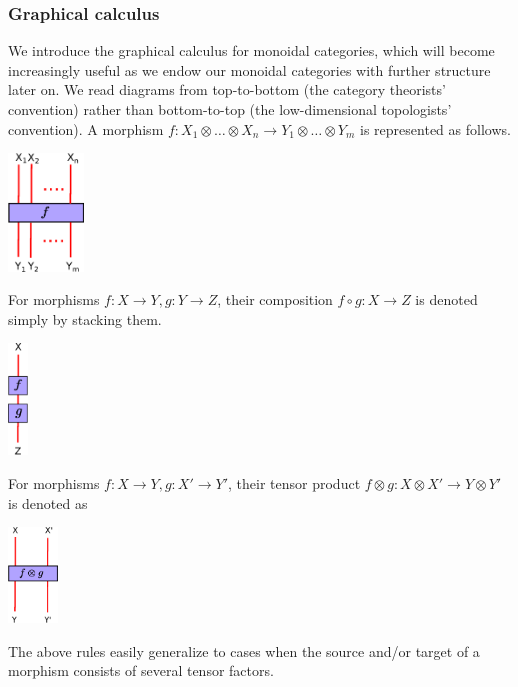 \documentclass[11pt]{book}
\theoremstyle{Rem}
\theoremstyle{definition}
\numberwithin{equation}{section}
\newcommand\ot{\otimes}
\newcommand{\ra}\rightarrow
\begin{document}
\subsubsection{Graphical calculus}
We introduce the graphical calculus for monoidal categories, which will become increasingly useful as we endow our monoidal categories with further structure later on. We read diagrams from top-to-bottom (the category theorists' convention) rather than bottom-to-top (the low-dimensional topologists' convention).
A morphism $f:X_1\ot\dots\ot X_n\ra Y_1\ot\dots\ot Y_m$ is represented as follows.
\begin{center}
\includegraphics[width=0.15\textwidth]{morphnew.eps}
\end{center}
For morphisms $f:X\ra Y, g:Y\ra Z$, their composition $f\circ g: X\ra Z$ is denoted simply by stacking them.

\begin{center}
\includegraphics[width=0.04\textwidth]{morphism.eps}
\end{center}

For morphisms $f:X\ra Y, g:X'\ra Y'$, their tensor product $f\ot g: X\ot X' \ra Y \ot Y'$ is denoted as
\begin{center}
\includegraphics[width=0.1\textwidth]{tensor.eps}
\end{center}
The above rules easily generalize to cases when the source and/or target of a morphism consists of several tensor factors.
\end{document}
